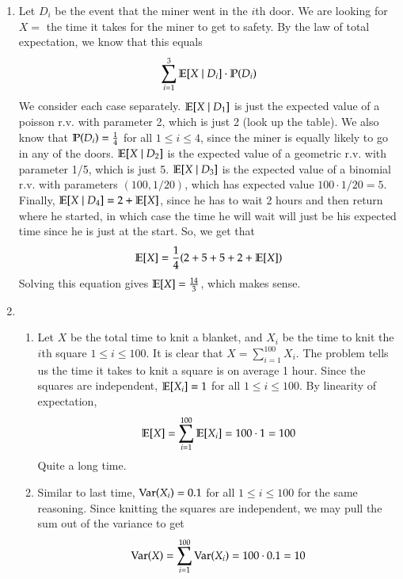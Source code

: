 \documentclass[12pt]{article}
\theoremstyle{definitionstyle}
\renewcommand{\P}{\mathbb{P}\qty}
\newcommand{\E}{\mathbb{E}\qty}
\newcommand{\Var}{\mathrm{Var}\qty}
\begin{document}
\begin{enumerate}[leftmargin=\labelsep]
		\newpage
		\item Let $D_i$ be the event that the miner went in the $i$th door. We are looking for $X = $ the time it takes for the miner to get to safety. By the law of total expectation, we know that this equals
		\begin{align*}
			\sum_{i=1}^3 \E[X \mid D_i] \cdot \P(D_i)
		\end{align*}
		We consider each case separately. $\E[X \mid D_1]$ is just the expected value of a poisson r.v. with parameter 2, which is just 2 (look up the table). We also know that $\P(D_i) = \frac14$ for all $1 \leq i \leq 4$, since the miner is equally likely to go in any of the doors. $\E[X \mid D_2]$ is the expected value of a geometric r.v. with parameter 1/5, which is just 5. $\E[X \mid D_3]$ is the expected value of a binomial r.v. with parameters $(100, 1/20)$, which has expected value $100 \cdot 1/20 = 5$. Finally, $\E[X \mid D_4] = 2 + \E[X]$, since he has to wait 2 hours and then return where he started, in which case the time he will wait will just be his expected time since he is just at the start. So, we get that
		\begin{align*}
			\E[X] = \frac14 \qty(2 + 5 + 5 + 2 + \E[X])
		\end{align*}
		Solving this equation gives $\E[X] = \frac{14}{3}$, which makes sense.
		
		\newpage
		\item \begin{enumerate}
			\item Let $X$ be the total time to knit a blanket, and $X_i$ be the time to knit the $i$th square $1 \leq i \leq 100$. It is clear that $X = \sum_{i=1}^{100} X_i$. The problem tells us the time it takes to knit a square is on average 1 hour. Since the squares are independent, $\E[X_i] = 1$ for all $1 \leq i \leq 100$. By linearity of expectation,
			\begin{align*}
				\E[X] = \sum_{i=1}^{100} \E[X_i] = 100 \cdot 1 = 100
			\end{align*}
			Quite a long time.
			
			\item Similar to last time, $\Var(X_i) = 0.1$ for all $1 \leq i \leq 100$ for the same reasoning. Since knitting the squares are independent, we may pull the sum out of the variance to get
			\begin{align*}
				\Var(X) = \sum_{i=1}^{100} \Var(X_i) = 100 \cdot 0.1 = 10
			\end{align*}
		

\end{enumerate}
\end{enumerate}
\end{document}

